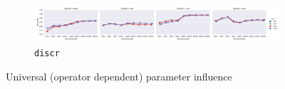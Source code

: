 \begin{figure}
  \begin{subfigure}[t]{\textwidth}
  \includegraphics[width=1.1\textwidth]{supplement/figures/universal-interaction-discr}

  \caption{\texttt{discr}}
  \label{fig:universal-discr}
  \end{subfigure}

  \caption{Universal (operator dependent) parameter influence}
  \label{fig:universal-parameters}
\end{figure}
